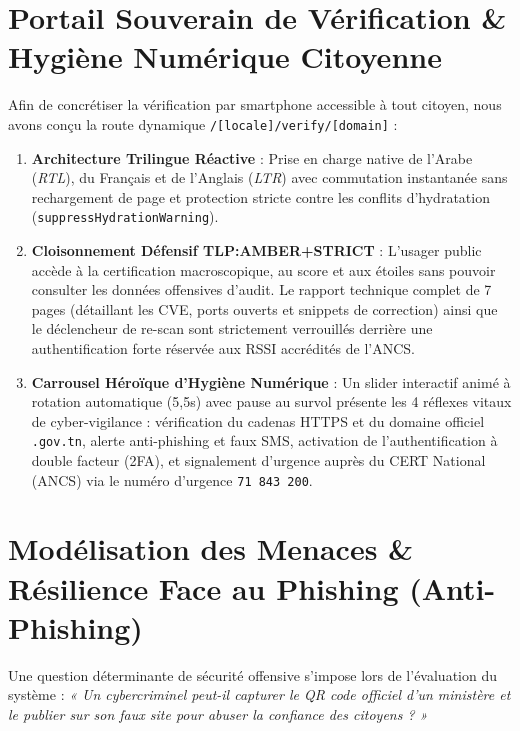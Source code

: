 \section{Portail Souverain de Vérification \& Hygiène Numérique Citoyenne}
Afin de concrétiser la vérification par smartphone accessible à tout citoyen, nous avons conçu la route dynamique \texttt{/[locale]/verify/[domain]} :
\begin{enumerate}
    \item \textbf{Architecture Trilingue Réactive} : Prise en charge native de l'Arabe (\textit{RTL}), du Français et de l'Anglais (\textit{LTR}) avec commutation instantanée sans rechargement de page et protection stricte contre les conflits d'hydratation (\texttt{suppressHydrationWarning}).
    \item \textbf{Cloisonnement Défensif TLP:AMBER+STRICT} : L'usager public accède à la certification macroscopique, au score et aux étoiles sans pouvoir consulter les données offensives d'audit. Le rapport technique complet de 7 pages (détaillant les CVE, ports ouverts et snippets de correction) ainsi que le déclencheur de re-scan sont strictement verrouillés derrière une authentification forte réservée aux RSSI accrédités de l'ANCS.
    \item \textbf{Carrousel Héroïque d'Hygiène Numérique} : Un slider interactif animé à rotation automatique (5,5s) avec pause au survol présente les 4 réflexes vitaux de cyber-vigilance : vérification du cadenas HTTPS et du domaine officiel \texttt{.gov.tn}, alerte anti-phishing et faux SMS, activation de l'authentification à double facteur (2FA), et signalement d'urgence auprès du CERT National (ANCS) via le numéro d'urgence \texttt{71 843 200}.
\end{enumerate}

\section{Modélisation des Menaces \& Résilience Face au Phishing (Anti-Phishing)}
Une question déterminante de sécurité offensive s'impose lors de l'évaluation du système : \textit{« Un cybercriminel peut-il capturer le QR code officiel d'un ministère et le publier sur son faux site pour abuser la confiance des citoyens ? »}

